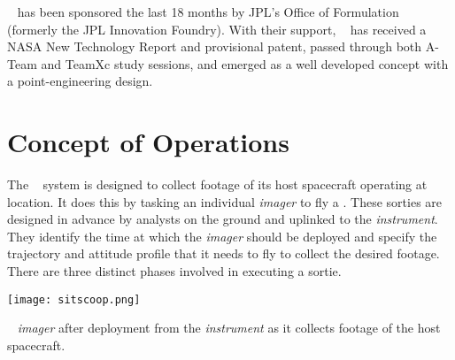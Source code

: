 \documentclass{tufte-handout}
\begin{document}
\clearpage
\sitslong~ has been sponsored the last 18 months by JPL's Office of 
Formulation (formerly the JPL Innovation Foundry). With their support, 
\sitsshort~ has received a NASA New Technology Report and provisional patent, passed through both 
A-Team and TeamXc study sessions, and emerged as a well developed concept 
with a point-engineering design.

\section{Concept of Operations}\label{sec:conops}


The \sitsshort~ system is designed to collect footage of its host spacecraft
operating at location. It does this by tasking an individual
\textit{imager} to fly a . These sorties are designed
in advance by analysts on the ground and uplinked to the \textit{instrument}. They identify
the time at which the \textit{imager} should be deployed and specify the trajectory and 
attitude profile that it needs to fly to collect the desired footage. There are 
three distinct phases involved in executing a sortie.

\begin{marginfigure}[-1.5 in]%
  \texttt{[image: sitscoop.png]}
  \caption{\sitsshort~ \textit{imager} after deployment from the \textit{instrument} as it collects footage of the
  host spacecraft.}
  \label{fig:sitscoop}
\end{marginfigure}

\end{document}
